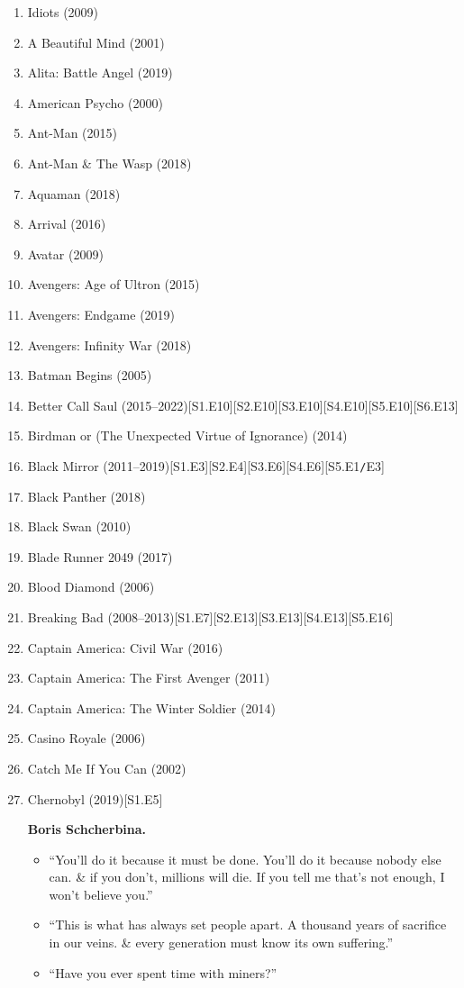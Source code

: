 \documentclass{article}
\begin{document}
\begin{enumerate}
	\item { Idiots} (2009)
	\item {\sc A Beautiful Mind} (2001)
	\item {\sc Alita: Battle Angel} (2019)
	\item {\sc American Psycho} (2000)
	\item {\sc Ant-Man} (2015)
	\item {\sc Ant-Man \& The Wasp} (2018)
	\item {\sc Aquaman} (2018)
	\item {\sc Arrival} (2016)
	\item {\sc Avatar} (2009)
	\item {\sc Avengers: Age of Ultron} (2015)
	\item {\sc Avengers: Endgame} (2019)
	\item {\sc Avengers: Infinity War} (2018)
	\item {\sc Batman Begins} (2005)
	\item {\sc Better Call Saul} (2015--2022)\hfill[S1.E10][S2.E10][S3.E10][S4.E10][S5.E10][S6.E13]
	\item {\sc Birdman or (The Unexpected Virtue of Ignorance)} (2014)
	\item Black Mirror (2011--2019)\hfill[S1.E3][S2.E4][S3.E6][S4.E6][S5.E1{\tt/}E3]
	\item {\sc Black Panther} (2018)
	\item {\sc Black Swan} (2010)
	\item {\sc Blade Runner 2049} (2017)
	\item {\sc Blood Diamond} (2006)
	\item {\sc Breaking Bad} (2008--2013)\hfill[S1.E7][S2.E13][S3.E13][S4.E13][S5.E16]
	\item {\sc Captain America: Civil War} (2016)
	\item {\sc Captain America: The First Avenger} (2011)
	\item {\sc Captain America: The Winter Soldier} (2014)
	\item {\sc Casino Royale} (2006)
	\item {\sc Catch Me If You Can} (2002)
	\item {\sc Chernobyl} (2019)\hfill[S1.E5]
	
	\textbf{Boris Schcherbina.}
	\begin{itemize}
		\item ``You'll do it because it must be done. You'll do it because nobody else can. \& if you don't, millions will die. If you tell me that's not enough, I won't believe you.''
		\item ``This is what has always set people apart. A thousand years of sacrifice in our veins. \& every generation must know its own suffering.''
		\item ``Have you ever spent time with miners?''
		

\end{itemize}
\end{enumerate}
\end{document}

